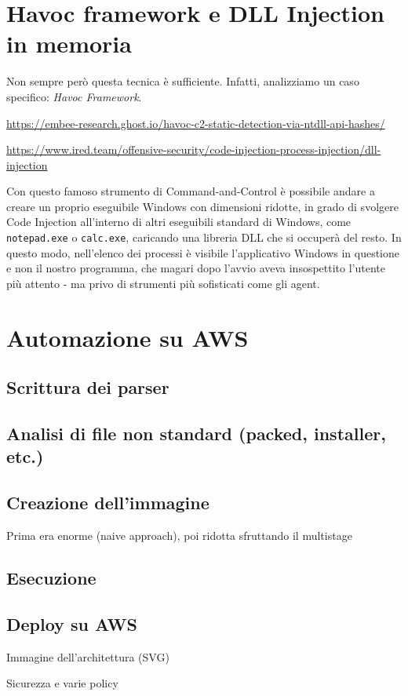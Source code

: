 \section{Havoc framework e DLL Injection in memoria}
Non sempre però questa tecnica è sufficiente. Infatti, analizziamo un caso specifico: \emph{Havoc Framework}.

\url{https://embee-research.ghost.io/havoc-c2-static-detection-via-ntdll-api-hashes/}

\url{https://www.ired.team/offensive-security/code-injection-process-injection/dll-injection}

Con questo famoso strumento di Command-and-Control è possibile andare a creare un proprio eseguibile Windows con dimensioni ridotte, in grado di svolgere Code Injection all'interno di altri eseguibili standard di Windows, come \texttt{notepad.exe} o \texttt{calc.exe}, caricando una libreria DLL che si occuperà del resto. In questo modo, nell'elenco dei processi è visibile l'applicativo Windows in questione e non il nostro programma, che magari dopo l'avvio aveva insospettito l'utente più attento - ma privo di strumenti più sofisticati come gli agent.

\section{Automazione su AWS}
\subsection{Scrittura dei parser}
\subsection{Analisi di file non standard (packed, installer, etc.)}
\subsection{Creazione dell'immagine}
Prima era enorme (naive approach), poi ridotta sfruttando il multistage
\subsection{Esecuzione}
\subsection{Deploy su AWS}
Immagine dell'architettura (SVG)

Sicurezza e varie policy